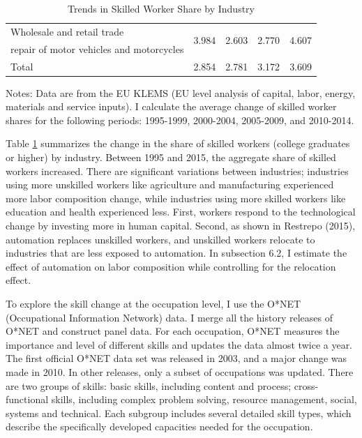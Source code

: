 \documentclass[12pt]{article}
\begin{document}
\begin{table}[h!]
\begin{center}
\begin{tabular}{l|cccc}
Wholesale and retail trade & \multirow{2}{*}{3.984} & \multirow{2}{*}{2.603} & \multirow{2}{*}{2.770} & \multirow{2}{*}{4.607} \\
repair of motor vehicles and motorcycles &&&&\\
Total & 2.854  & 2.781 & 3.172  & 3.609 \\\hline
\end{tabular}
\end{center}
\caption{Trends in Skilled Worker Share by Industry}
\label{Industry_trend}
{\scriptsize Notes: Data are from the EU KLEMS (EU level analysis of capital, labor, energy, materials and service inputs). I calculate the average change of skilled worker shares for the following periods: 1995-1999, 2000-2004, 2005-2009, and 2010-2014.}
\end{table}

Table \ref{Industry_trend} summarizes the change in the share of skilled workers (college graduates or higher) by industry. Between 1995 and 2015, the aggregate share of skilled workers increased. There are significant variations between industries; industries using more unskilled workers like agriculture and manufacturing experienced more labor composition change, while industries using more skilled workers like education and health experienced less. First, workers respond to the technological change by investing more in human capital. Second, as shown in Restrepo (2015)\nocite{Restrepo2015}, automation replaces unskilled workers, and unskilled workers relocate to industries that are less exposed to automation. In subsection 6.2, I estimate the effect of automation on labor composition while controlling for the relocation effect. 

To explore the skill change at the occupation level, I use the O*NET (Occupational Information Network) data. I merge all the history releases of O*NET and construct panel data. For each occupation, O*NET measures the importance and level of different skills and updates the data almost twice a year. The first official O*NET data set was released in 2003, and a major change was made in 2010. In other releases, only a subset of occupations was updated. There are two groups of skills: basic skills, including content and process; cross-functional skills, including complex problem solving, resource management, social, systems and technical. Each subgroup includes several detailed skill types, which describe the specifically developed capacities needed for the occupation. 
\end{document}
